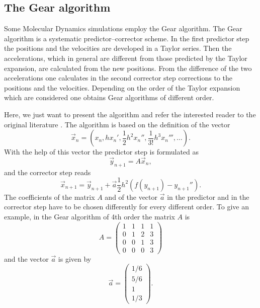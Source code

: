 \subsection{The Gear algorithm}
Some Molecular Dynamics simulations employ the Gear algorithm. The Gear
algorithm is a systematic predictor--corrector scheme. In the first predictor
step the positions and the velocities are developed in a Taylor series. Then
the accelerations, which in general are different from those predicted by the
Taylor expansion,  are calculated from the new positions. From the difference
of the two accelerations one calculates in the second corrector step corrections
to the positions and the velocities. Depending on the order of the Taylor
expansion which are considered one obtains Gear algorithms of different order.

Here, we just want to present the algorithm and refer the interested reader to
the original literature \cite{Gear}. The algorithm is based on the definition
of the vector
\begin{displaymath}
  \vec{x}_n = (x_n, h x_n', \frac{1}{2} h^2 x_n'', \frac{1}{3!} h^3 x_n'''
           , \ldots).
\end{displaymath}
With the help of this vector the predictor step is formulated as
\begin{displaymath}
  \vec{y}_{n+1} = A \vec{x}_n,
\end{displaymath}
and the corrector step reads
\begin{displaymath}
  \vec{x}_{n+1} = \vec{y}_{n+1} + \vec{a} \frac{1}{2} h^2
               \left( f(y_{n+1}) - y_{n+1}''\right).
\end{displaymath}
The coefficients of the matrix $A$ and of the vector $\vec{a}$ in the
predictor and in the corrector step have to be chosen differently for every
different order. To give an example, in the Gear algorithm of 4th order
the matrix $A$ is
\begin{displaymath}
  A = \left( \begin{array}{cccc}
                    1 & 1 & 1 & 1 \\
                    0 & 1 & 2 & 3 \\
                    0 & 0 & 1 & 3 \\
                    0 & 0 & 0 & 3
              \end{array} 
          \right)
\end{displaymath}
and the vector $\vec{a}$ is given by
\begin{displaymath}
  \vec{a} = \left( 
             \begin{array}{c}
               1/6 \\
               5/6 \\
               1 \\
               1/3
              \end{array}
             \right).
\end{displaymath}
